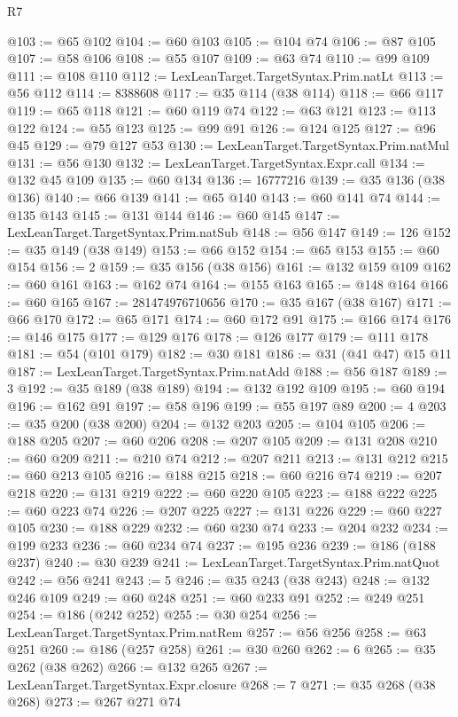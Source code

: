 \begin{lexlean}{R7}
\begin{coremodule}
@103 := @65 @102
@104 := @60 @103
@105 := @104 @74
@106 := @87 @105
@107 := @58 @106
@108 := @55 @107
@109 := @63 @74
@110 := @99 @109
@111 := @108 @110
@112 := LexLeanTarget.TargetSyntax.Prim.natLt
@113 := @56 @112
@114 := 8388608
@117 := @35 @114 (@38 @114)
@118 := @66 @117
@119 := @65 @118
@121 := @60 @119 @74
@122 := @63 @121
@123 := @113 @122
@124 := @55 @123
@125 := @99 @91
@126 := @124 @125
@127 := @96 @45
@129 := @79 @127 @53
@130 := LexLeanTarget.TargetSyntax.Prim.natMul
@131 := @56 @130
@132 := LexLeanTarget.TargetSyntax.Expr.call
@134 := @132 @45 @109
@135 := @60 @134
@136 := 16777216
@139 := @35 @136 (@38 @136)
@140 := @66 @139
@141 := @65 @140
@143 := @60 @141 @74
@144 := @135 @143
@145 := @131 @144
@146 := @60 @145
@147 := LexLeanTarget.TargetSyntax.Prim.natSub
@148 := @56 @147
@149 := 126
@152 := @35 @149 (@38 @149)
@153 := @66 @152
@154 := @65 @153
@155 := @60 @154
@156 := 2
@159 := @35 @156 (@38 @156)
@161 := @132 @159 @109
@162 := @60 @161
@163 := @162 @74
@164 := @155 @163
@165 := @148 @164
@166 := @60 @165
@167 := 281474976710656
@170 := @35 @167 (@38 @167)
@171 := @66 @170
@172 := @65 @171
@174 := @60 @172 @91
@175 := @166 @174
@176 := @146 @175
@177 := @129 @176
@178 := @126 @177
@179 := @111 @178
@181 := @54 (@101 @179)
@182 := @30 @181
@186 := @31 (@41 @47) @15 @11
@187 := LexLeanTarget.TargetSyntax.Prim.natAdd
@188 := @56 @187
@189 := 3
@192 := @35 @189 (@38 @189)
@194 := @132 @192 @109
@195 := @60 @194
@196 := @162 @91
@197 := @58 @196
@199 := @55 @197 @89
@200 := 4
@203 := @35 @200 (@38 @200)
@204 := @132 @203
@205 := @104 @105
@206 := @188 @205
@207 := @60 @206
@208 := @207 @105
@209 := @131 @208
@210 := @60 @209
@211 := @210 @74
@212 := @207 @211
@213 := @131 @212
@215 := @60 @213 @105
@216 := @188 @215
@218 := @60 @216 @74
@219 := @207 @218
@220 := @131 @219
@222 := @60 @220 @105
@223 := @188 @222
@225 := @60 @223 @74
@226 := @207 @225
@227 := @131 @226
@229 := @60 @227 @105
@230 := @188 @229
@232 := @60 @230 @74
@233 := @204 @232
@234 := @199 @233
@236 := @60 @234 @74
@237 := @195 @236
@239 := @186 (@188 @237)
@240 := @30 @239
@241 := LexLeanTarget.TargetSyntax.Prim.natQuot
@242 := @56 @241
@243 := 5
@246 := @35 @243 (@38 @243)
@248 := @132 @246 @109
@249 := @60 @248
@251 := @60 @233 @91
@252 := @249 @251
@254 := @186 (@242 @252)
@255 := @30 @254
@256 := LexLeanTarget.TargetSyntax.Prim.natRem
@257 := @56 @256
@258 := @63 @251
@260 := @186 (@257 @258)
@261 := @30 @260
@262 := 6
@265 := @35 @262 (@38 @262)
@266 := @132 @265
@267 := LexLeanTarget.TargetSyntax.Expr.closure
@268 := 7
@271 := @35 @268 (@38 @268)
@273 := @267 @271 @74

\end{coremodule}
\end{lexlean}

